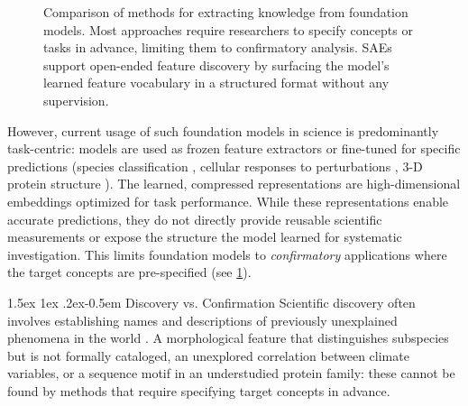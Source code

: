 \documentclass[runningheads]{llncs}
\makeatletter
\renewcommand{\paragraph}{%
  \@startsection{paragraph}{4}%
  {\z@}{1.5ex \@plus 1ex \@minus .2ex}{-0.5em}%
  {\normalfont\normalsize\bfseries}%
}
\newcommand{\cmark}{\textcolor{green}{\ding{51}}}
\makeatother
\begin{document}
\begin{figure}[t]
\caption{Comparison of methods for extracting knowledge from foundation models. 
    Most approaches require researchers to specify concepts or tasks in advance, limiting them to confirmatory analysis. 
    SAEs support open-ended feature discovery by surfacing the model's learned feature vocabulary in a structured format without any supervision.}\label{fig:related-work}
\end{figure}

However, current usage of such foundation models in science is predominantly task-centric: models are used as frozen feature extractors or fine-tuned for specific predictions (species classification \citep{vanhorn2021inat21}, cellular responses to perturbations \citep{roohani2025vcc}, 3-D protein structure \citep{haas2018continuous,pereira2021high}).
The learned, compressed representations are high-dimensional embeddings optimized for task performance.
While these representations enable accurate predictions, they do not directly provide reusable scientific measurements or expose the structure the model learned for systematic investigation.
This limits foundation models to \emph{confirmatory} applications where the target concepts are pre-specified (see \cref{fig:related-work}).

\paragraph{Discovery vs. Confirmation}
Scientific discovery often involves establishing names and descriptions of previously unexplained phenomena in the world \citep{kuhn1970structure}.
A morphological feature that distinguishes subspecies but is not formally cataloged, an unexplored correlation between climate variables, or a sequence motif in an understudied protein family: these cannot be found by methods that require specifying target concepts in advance.
\end{document}

